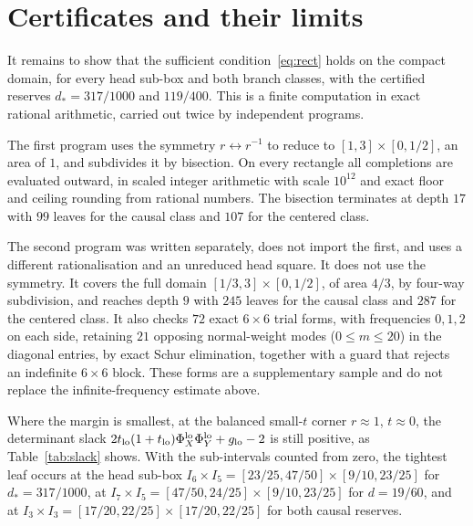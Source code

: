 \documentclass[10pt]{article}
\theoremstyle{remark}
\newcommand{\dstar}{d_{*}}
\begin{document}
\section{Certificates and their limits}\label{sec:cert}

It remains to show that the sufficient condition~\eqref{eq:rect} holds on the compact domain, for every head sub-box and both branch classes, with the certified reserves $\dstar=317/1000$ and $119/400$. This is a finite computation in exact rational arithmetic, carried out twice by independent programs.

The first program uses the symmetry $r\leftrightarrow r^{-1}$ to reduce to $[1,3]\times[0,1/2]$, an area of $1$, and subdivides it by bisection. On every rectangle all completions are evaluated outward, in scaled integer arithmetic with scale $10^{12}$ and exact floor and ceiling rounding from rational numbers. The bisection terminates at depth $17$ with $99$ leaves for the causal class and $107$ for the centered class.

The second program was written separately, does not import the first, and uses a different rationalisation and an unreduced head square. It does not use the symmetry. It covers the full domain $[1/3,3]\times[0,1/2]$, of area $4/3$, by four-way subdivision, and reaches depth $9$ with $245$ leaves for the causal class and $287$ for the centered class. It also checks $72$ exact $6\times6$ trial forms, with frequencies $0,1,2$ on each side, retaining $21$ opposing normal-weight modes ($0\le m\le20$) in the diagonal entries, by exact Schur elimination, together with a guard that rejects an indefinite $6\times6$ block. These forms are a supplementary sample and do not replace the infinite-frequency estimate above.

Where the margin is smallest, at the balanced small-$t$ corner $r\approx1$, $t\approx0$, the determinant slack $2t_{\rm lo}(1+t_{\rm lo})\Phi_X^{\rm lo}\Phi_Y^{\rm lo}+g_{\rm lo}-2$ is still positive, as Table~\ref{tab:slack} shows. With the sub-intervals counted from zero, the tightest leaf occurs at the head sub-box $I_6\times I_5=[23/25,47/50]\times[9/10,23/25]$ for $\dstar=317/1000$, at $I_7\times I_5=[47/50,24/25]\times[9/10,23/25]$ for $d=19/60$, and at $I_3\times I_3=[17/20,22/25]\times[17/20,22/25]$ for both causal reserves.
\end{document}
